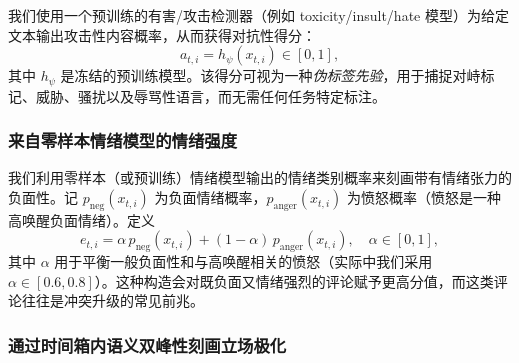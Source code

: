 \documentclass[conference]{IEEEtran}
\begin{document}
我们使用一个预训练的有害/攻击检测器（例如 toxicity/insult/hate 模型）为给定文本输出攻击性内容概率，从而获得对抗性得分：
\begin{equation}
a_{t,i} = h_{\psi}(x_{t,i}) \in [0,1],
\label{eq:attack_score}
\end{equation}
其中 $h_{\psi}$ 是冻结的预训练模型。该得分可视为一种\emph{伪标签先验}，用于捕捉对峙标记、威胁、骚扰以及辱骂性语言，而无需任何任务特定标注。

\subsubsection{来自零样本情绪模型的情绪强度}

我们利用零样本（或预训练）情绪模型输出的情绪类别概率来刻画带有情绪张力的负面性。记 $p_{\text{neg}}(x_{t,i})$ 为负面情绪概率，$p_{\text{anger}}(x_{t,i})$ 为愤怒概率（愤怒是一种高唤醒负面情绪）。定义
\begin{equation}
e_{t,i} = \alpha\, p_{\text{neg}}(x_{t,i}) + (1-\alpha)\, p_{\text{anger}}(x_{t,i}), \quad \alpha \in [0,1],
\label{eq:emotion_score}
\end{equation}
其中 $\alpha$ 用于平衡一般负面性和与高唤醒相关的愤怒（实际中我们采用 $\alpha\in[0.6,0.8]$）。这种构造会对既负面又情绪强烈的评论赋予更高分值，而这类评论往往是冲突升级的常见前兆。

\subsubsection{通过时间箱内语义双峰性刻画立场极化}
\end{document}
